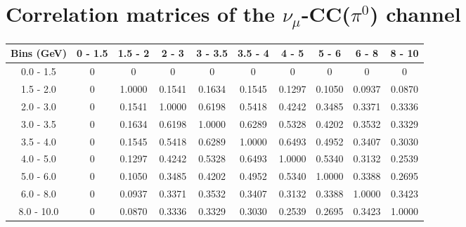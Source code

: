 \documentclass[aps, prd, reprint,showpacs,  preprintnumbers,amsmath,amssymb,superscriptaddress, nofootinbib]{revtex4-1}
\makeatletter
\newcommand{\numu}{\mbox{$\nu_{\mu}$}}                   %
\renewenvironment{table}
  {\def\@captype{table}}
  {}
\makeatother
\begin{document}
\section{Correlation matrices of the $\numu$-CC($\pi^{0}$) channel}

\vspace{0.3cm}


\begin{table}
\centering
\begin{tabular}{cccccccccc}
\hline
Bins (GeV) & 0 - 1.5 & 1.5 - 2 & 2 - 3 & 3 - 3.5 & 3.5 - 4 & 4 - 5 & 5 - 6 & 6 - 8 & 8 - 10 \\ 
\hline
  0.0 -  1.5    &     0  &     0  &     0  &     0  &     0  &     0  &     0  &     0  &     0   \\ 
  1.5 -  2.0    &     0  &     1.0000  &     0.1541  &     0.1634  &     0.1545  &     0.1297  &     0.1050  &     0.0937  &     0.0870   \\ 
  2.0 -  3.0    &     0  &     0.1541  &     1.0000  &     0.6198  &     0.5418  &     0.4242  &     0.3485  &     0.3371  &     0.3336   \\ 
  3.0 -  3.5    &     0  &     0.1634  &     0.6198  &     1.0000  &     0.6289  &     0.5328  &     0.4202  &     0.3532  &     0.3329   \\ 
  3.5 -  4.0    &     0  &     0.1545  &     0.5418  &     0.6289  &     1.0000  &     0.6493  &     0.4952  &     0.3407  &     0.3030   \\ 
  4.0 -  5.0    &     0  &     0.1297  &     0.4242  &     0.5328  &     0.6493  &     1.0000  &     0.5340  &     0.3132  &     0.2539   \\ 
  5.0 -  6.0    &     0  &     0.1050  &     0.3485  &     0.4202  &     0.4952  &     0.5340  &     1.0000  &     0.3388  &     0.2695   \\ 
  6.0 -  8.0    &     0  &     0.0937  &     0.3371  &     0.3532  &     0.3407  &     0.3132  &     0.3388  &     1.0000  &     0.3423   \\ 
  8.0 - 10.0    &     0  &     0.0870  &     0.3336  &     0.3329  &     0.3030  &     0.2539  &     0.2695  &     0.3423  &     1.0000   \\ 
\hline
\hline
\end{tabular}
\caption{Correlation matrix for bins of $\sigma(E_\nu)$.}
\label{tb:pi0_Enu_cov}
\end{table}


\vspace{0.7cm}
\end{document}
